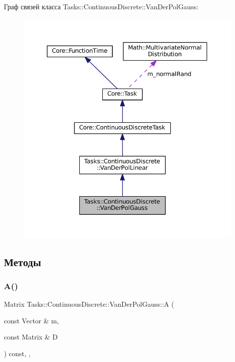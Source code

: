 Граф связей класса Tasks\+:\+:Continuous\+Discrete\+:\+:Van\+Der\+Pol\+Gauss\+:
\nopagebreak
\begin{figure}[H]
\begin{center}
\leavevmode
\includegraphics[width=350pt]{class_tasks_1_1_continuous_discrete_1_1_van_der_pol_gauss__coll__graph}
\end{center}
\end{figure}


\subsection{Методы}
\hypertarget{class_tasks_1_1_continuous_discrete_1_1_van_der_pol_gauss_acb431d1a24b276610f6b7c7ff343fb9f}{}\label{class_tasks_1_1_continuous_discrete_1_1_van_der_pol_gauss_acb431d1a24b276610f6b7c7ff343fb9f} 
\subsubsection{\texorpdfstring{A()}{A()}}
{\footnotesize\ttfamily Matrix Tasks\+::\+Continuous\+Discrete\+::\+Van\+Der\+Pol\+Gauss\+::A (\begin{DoxyParamCaption}\item[{const Vector \&}]{m,  }\item[{const Matrix \&}]{D }\end{DoxyParamCaption}) const\hspace{0.3cm}{\ttfamily [override]}, {\ttfamily [protected]}, {\ttfamily [virtual]}}



